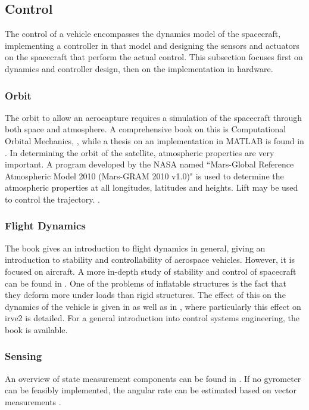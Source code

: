 \subsection{Control} \label{sec:control}
The control of a vehicle encompasses the dynamics model of the spacecraft, implementing a controller in that model and designing the sensors and actuators on the spacecraft that perform the actual control. This subsection focuses first on dynamics and controller design, then on the implementation in hardware.

\subsubsection{Orbit}
The orbit to allow an aerocapture requires a simulation of the spacecraft through both space and atmosphere. A comprehensive book on this is Computational Orbital Mechanics, \cite{Weiland2004}, while a thesis on an implementation in MATLAB is found in \cite{Leszczynski1998}. In determining the orbit of the satellite, atmospheric properties are very important. A program developed by the NASA named ``Mars-Global Reference Atmospheric Model 2010 (Mars-GRAM 2010 v1.0)" is used to determine the atmospheric properties at all longitudes, latitudes and heights. \cite{Justus2001} Lift may be used to control the trajectory. \cite{Esmaelzadeh2010}.

\subsubsection{Flight Dynamics}
The book \cite{Mulder2013} gives an introduction to flight dynamics in general, giving an introduction to stability and controllability of aerospace vehicles. However, it is focused on aircraft. A more in-depth study of stability and control of spacecraft can be found in \cite{Steketee1967, Ito2002}. One of the problems of inflatable structures is the fact that they deform more under loads than rigid structures. The effect of this on the dynamics of the vehicle is given in \cite{Axdahl2009} as well as in \cite{Bose2009}, where particularly this effect on \gls{irve2} is detailed. For a general introduction into control systems engineering, the book \cite{Nise2011} is available.

\subsubsection{Sensing}
An overview of state measurement components can be found in \cite{Wertz2011a}. If no gyrometer can be feasibly implemented, the angular rate can be estimated based on vector measurements \cite{Azor1998}.


